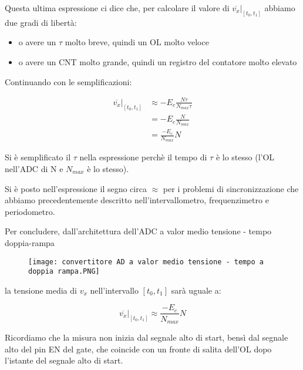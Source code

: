 Questa ultima espressione ci dice che, per calcolare il valore di $\left. \overline{v_x} \right|_{[t_0, t_1]}$ abbiamo due gradi di libertà: 
\begin{itemize}
    \item o avere un $\tau$ molto breve, quindi un OL molto veloce 
    \item o avere un CNT molto grande, quindi un registro del contatore molto elevato
\end{itemize}

Continuando con le semplificazioni: 

{
    \Large 
    \begin{equation}
        \begin{split}
        \left. \overline{v_x} \right|_{[t_0, t_1]}
        &\approx 
        -E_c 
        \frac{N \tau}{N_{max} \tau}
        \\
        &= 
        -E_c 
        \frac{N }{N_{max}}
        \\
        &= 
        \frac{-E_c}{N_{max}} N
        \end{split}
    \end{equation}
}

Si è semplificato il $\tau$ nella espressione perchè il tempo di $\tau$ è lo stesso (l'OL nell'ADC di N e $N_{max}$ è lo stesso). \newline 

Si è posto nell'espressione il segno circa $\approx$ per i problemi di sincronizzazione che abbiamo precedentemente descritto nell'intervallometro, frequenzimetro e periodometro. \newline 

\newpage 

Per concludere, dall'architettura dell'ADC a valor medio tensione - tempo doppia-rampa 

\begin{figure}[h]
    \centering
    \texttt{[image: convertitore AD a valor medio tensione - tempo a doppia rampa.PNG]}
\end{figure}


la tensione media di $v_x$ nell'intervallo $[t_0, t_1]$ sarà uguale a: 

{
    \Large 
    \begin{equation}
    \left. \overline{v_x} \right|_{[t_0, t_1]}
    \approx  
    \frac{-E_c}{N_{max}} N
    \end{equation}
}

Ricordiamo che la misura non inizia dal segnale alto di start, 
bensì dal segnale alto del pin EN del gate, che coincide con un fronte di salita dell'OL dopo l'istante del segnale alto di start. \newline 

